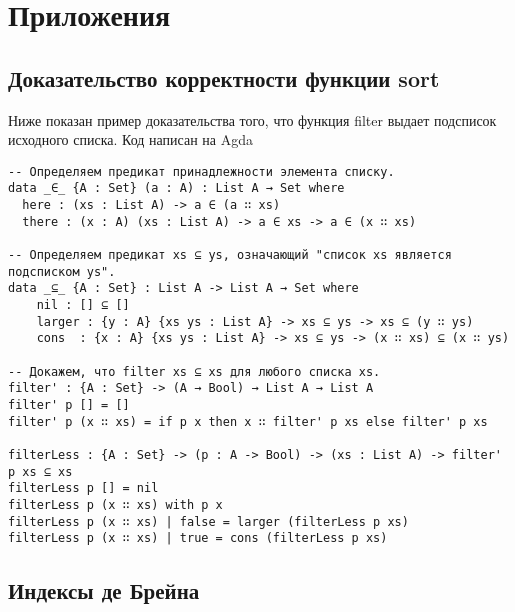 \appendix
\section*{Приложения}
\renewcommand{\thesubsection}{\Alph{subsection}}

\subsection{Доказательство корректности функции sort}\label{sort_proof}

Ниже показан пример доказательства того, что функция filter выдает подсписок исходного списка.
Код написан на Agda\cite{agda}

\begin{lstlisting}
-- Определяем предикат принадлежности элемента списку.
data _∈_ {A : Set} (a : A) : List A → Set where
  here : (xs : List A) -> a ∈ (a ∷ xs)
  there : (x : A) (xs : List A) -> a ∈ xs -> a ∈ (x ∷ xs)

-- Определяем предикат xs ⊆ ys, означающий "список xs является подсписком ys".
data _⊆_ {A : Set} : List A -> List A → Set where
    nil : [] ⊆ []
    larger : {y : A} {xs ys : List A} -> xs ⊆ ys -> xs ⊆ (y ∷ ys)
    cons  : {x : A} {xs ys : List A} -> xs ⊆ ys -> (x ∷ xs) ⊆ (x ∷ ys)

-- Докажем, что filter xs ⊆ xs для любого списка xs.
filter' : {A : Set} -> (A → Bool) → List A → List A
filter' p [] = []
filter' p (x ∷ xs) = if p x then x ∷ filter' p xs else filter' p xs

filterLess : {A : Set} -> (p : A -> Bool) -> (xs : List A) -> filter' p xs ⊆ xs
filterLess p [] = nil
filterLess p (x ∷ xs) with p x
filterLess p (x ∷ xs) | false = larger (filterLess p xs)
filterLess p (x ∷ xs) | true = cons (filterLess p xs)

\end{lstlisting}

\subsection{Индексы де Брейна}\label{de_brujin}


